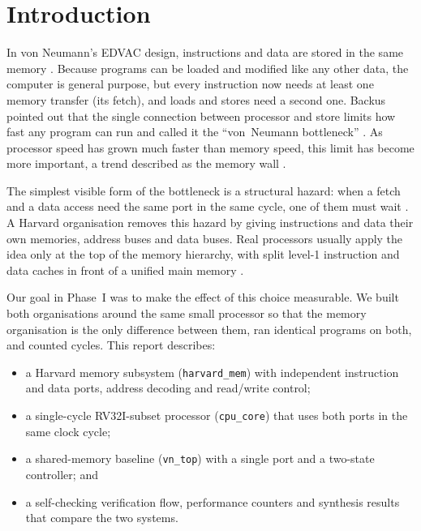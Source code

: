 \documentclass[conference]{IEEEtran}
\newcommand{\sig}[1]{\texttt{#1}}
\begin{document}
\section{Introduction}
In von Neumann's EDVAC design, instructions and data are stored in the same memory
\cite{vonneumann1945}. Because programs can be loaded and modified like any other data, the
computer is general purpose, but every instruction now needs at least one memory transfer
(its fetch), and loads and stores need a second one. Backus pointed out that the single
connection between processor and store limits how fast any program can run and called it the
``von~Neumann bottleneck'' \cite{backus1978}. As processor speed has grown much faster than
memory speed, this limit has become more important, a trend described as the memory wall
\cite{wulf1995}.

The simplest visible form of the bottleneck is a structural hazard: when a fetch and a data
access need the same port in the same cycle, one of them must wait \cite{hp_quant}. A Harvard
organisation removes this hazard by giving instructions and data their own memories, address
buses and data buses. Real processors usually apply the idea only at the top of the memory
hierarchy, with split level-1 instruction and data caches in front of a unified main memory
\cite{hp_quant,ph_riscv}.

Our goal in Phase~I was to make the effect of this choice measurable. We built both
organisations around the same small processor so that the memory organisation is the only
difference between them, ran identical programs on both, and counted cycles. This report
describes:
\begin{itemize}
  \item a Harvard memory subsystem (\sig{harvard\_mem}) with independent instruction and
        data ports, address decoding and read/write control;
  \item a single-cycle RV32I-subset processor (\sig{cpu\_core}) that uses both ports in the
        same clock cycle;
  \item a shared-memory baseline (\sig{vn\_top}) with a single port and a two-state
        controller; and
  \item a self-checking verification flow, performance counters and synthesis results that
        compare the two systems.
\end{itemize}
\end{document}
